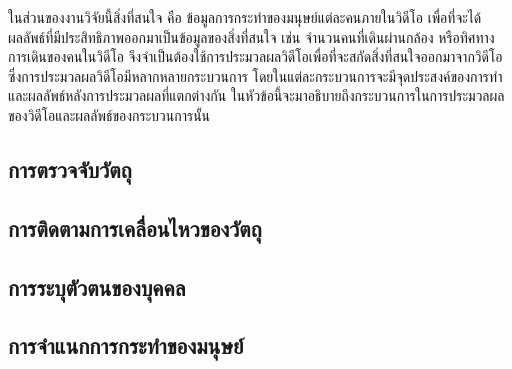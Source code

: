 ในส่วนของงานวิจัยนี้สิ่งที่สนใจ คือ ข้อมูลการกระทำของมนุษย์แต่ละคนภายในวิดีโอ เพื่อที่จะได้ผลลัพธ์ที่มีประสิทธิภาพออกมาเป็นข้อมูลของสิ่งที่สนใจ เช่น จำนวนคนที่เดินผ่านกล้อง 
หรือทิศทางการเดินของคนในวิดีโอ จึงจำเป็นต้องใช้การประมวลผลวิดีโอเพื่อที่จะสกัดสิ่งที่สนใจออกมาจากวิดีโอ ซึ่งการประมวลผลวิดีโอมีหลากหลายกระบวนการ 
โดยในแต่ละกระบวนการจะมีจุดประสงค์ของการทำและผลลัพธ์หลังการประมวลผลที่แตกต่างกัน ในหัวข้อนี้จะมาอธิบายถึงกระบวนการในการประมวลผลของวิดีโอและผลลัพธ์ของกระบวนการนั้น
\subsection{การตรวจจับวัตถุ}


\subsection{การติดตามการเคลื่อนไหวของวัตถุ}


\clearpage
\subsection{การระบุตัวตนของบุคคล}


\clearpage
\subsection{การจำแนกการกระทำของมนุษย์}
